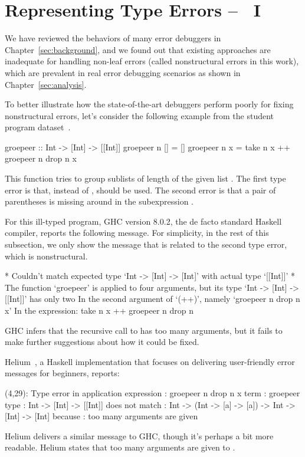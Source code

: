 \documentclass[12pt]{report}	%
\begin{document}
\chapter{Representing Type Errors -- \newCompiler\ I}
\label{sec:features}

We have reviewed the behaviors of many error debuggers in Chapter~\ref{sec:background},
and we found out that existing approaches are inadequate for handling non-leaf errors (called nonstructural errors in this work), 
which are prevalent in real error debugging scenarios as shown in Chapter~\ref{sec:analysis}.

To better illustrate how the state-of-the-art debuggers perform poorly for fixing nonstructural errors, 
let's consider the following example from the student program dataset~\cite{Hage09:Neon}.
%
\begin{program}
groepeer :: Int -> [Int] -> [[Int]]
groepeer n [] = []
groepeer n x  = take n x ++ groepeer n drop n x
\end{program}
%
This function
tries to group sublists of length  of the given list .
The first type error is that, instead of \prog{++}, \prog{:}
should be used. The second
error is that 
a pair of parentheses
is missing around 
in the subexpression
.

For this ill-typed program, GHC version 8.0.2,
the de facto standard Haskell compiler,
reports the following message.
For simplicity, in the rest of this subsection,
we only show the message 
that is related to the second type error, which is nonstructural.
%
\begin{program}
* Couldn't match expected type `Int -> [Int] -> [Int]'
    with actual type `[[Int]]'
* The function `groepeer' is applied to four arguments,
    but its type `Int -> [Int] -> [[Int]]' has only two
    In the second argument of `(++)', namely `groepeer n drop n x'
    In the expression: take n x ++ groepeer n drop n
\end{program}
%
GHC infers that the recursive call to  has too many arguments,
but it fails to make further suggestions about how it could be fixed.

Helium~\cite{Heeren03:HLH}, a Haskell implementation that
focuses on delivering user-friendly error messages for
beginners, reports:
%
\begin{program}
(4,29): Type error in application
 expression       : groepeer n drop n x
 term             : groepeer
   type           : Int -> [Int]               -> [[Int]]
   does not match : Int -> (Int -> [a] -> [a]) -> Int -> [Int] -> [Int]
 because          : too many arguments are given
\end{program}
%
Helium delivers a similar message to GHC, though it's perhaps a bit more readable.
Helium states that too many arguments
are given to . 
\end{document}
